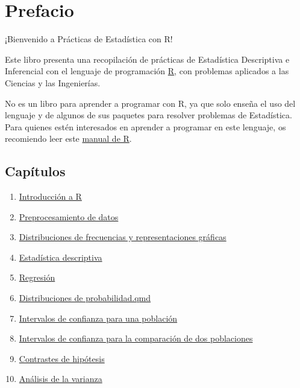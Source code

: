 \documentclass[
  a4paper,
]{scrreport}
\providecommand{\tightlist}{%
  \setlength{\itemsep}{0pt}\setlength{\parskip}{0pt}}\usepackage{longtable,booktabs,array}
\theoremstyle{definition}
\theoremstyle{remark}
\begin{document}
\hypertarget{prefacio}{%
\chapter*{Prefacio}\label{prefacio}}


¡Bienvenido a Prácticas de Estadística con R!

Este libro presenta una recopilación de prácticas de Estadística
Descriptiva e Inferencial con el lenguaje de programación
\href{https://www.r-project.org/}{R}, con problemas aplicados a las
Ciencias y las Ingenierías.

No es un libro para aprender a programar con R, ya que solo enseña el
uso del lenguaje y de algunos de sus paquetes para resolver problemas de
Estadística. Para quienes estén interesados en aprender a programar en
este lenguaje, os recomiendo leer este
\href{https://aprendeconalf.es/manual-r/}{manual de R}.

\hypertarget{capuxedtulos}{%
\section*{Capítulos}\label{capuxedtulos}}


\begin{enumerate}
\def\labelenumi{\arabic{enumi}.}
\tightlist
\item
  \href{/01-intro.qmd}{Introducción a R}
\item
  \protect\hyperlink{preprocesamiento-de-datos}{Preprocesamiento de
  datos}
\item
  \protect\hyperlink{distribuciones-de-frecuencias-y-representaciones-gruxe1ficas}{Distribuciones
  de frecuencias y representaciones gráficas}
\item
  \protect\hyperlink{estaduxedstica-descriptiva}{Estadística
  descriptiva}
\item
  \protect\hyperlink{regresiuxf3n}{Regresión}
\item
  \protect\hyperlink{distribuciones-de-probabilidad}{Distribuciones de
  probabilidad.qmd}
\item
  \protect\hyperlink{intervalos-de-confianza-para-medias-y-proporciones-de-una-poblaciuxf3n}{Intervalos
  de confianza para una población}
\item
  \protect\hyperlink{intervalos-de-confianza-para-la-comparaciuxf3n-de-medias-y-proporciones-de-dos-poblaciones}{Intervalos
  de confianza para la comparación de dos poblaciones}
\item
  \protect\hyperlink{intervalos-de-confianza-para-la-comparaciuxf3n-de-medias-y-proporciones-de-dos-poblaciones-1}{Contrastes
  de hipótesis}
\item
  \protect\hyperlink{anuxe1lisis-de-la-varianza-anova}{Análisis de la
  varianza}
\end{enumerate}
\end{document}
